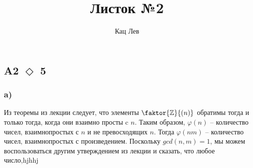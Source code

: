\documentclass[a4paper]{article}
\title{Листок №2}
\author{Кац Лев}
\renewcommand{\phi}{\varphi}
\newcommand{\task}[2]{A#1 $\Diamond$ #2}
\newcommand{\fact}[2]{\faktor{#1}{\left(#2\right)}}
\begin{document}
  \maketitle

  \subsection*{\task{2}{5}}
  \subsubsection*{a)}
  Из теоремы из лекции следует, что элементы $\fact{\mathbb{Z}}{n}$ обратимы тогда и только тогда, когда они взаимно просты c $n$. Таким образом, $\phi(n)$ -- количество чисел, взаимнопростых с $n$ и не превосходящих $n$. Тогда $\phi(nm)$ -- количество чисел, взаимнопростых с произведением. Поскольку $gcd(n, m)=1$, мы можем воспользоваться другим утверждением из лекции и сказать, что любое число,hjhhj
\end{document}
